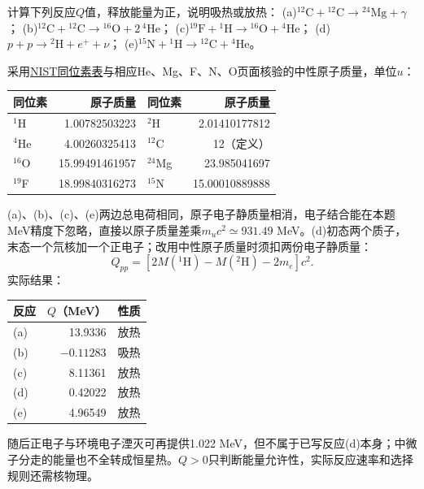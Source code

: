 \begin{exercise}
计算下列反应$Q$值，释放能量为正，说明吸热或放热：
(a)$^{12}\mathrm C+{}^{12}\mathrm C\to{}^{24}\mathrm{Mg}+\gamma$；
(b)$^{12}\mathrm C+{}^{12}\mathrm C\to{}^{16}\mathrm O+2\,{}^4\mathrm{He}$；
(c)$^{19}\mathrm F+{}^1\mathrm H\to{}^{16}\mathrm O+{}^4\mathrm{He}$；
(d)$p+p\to{}^2\mathrm H+e^++\nu$；
(e)$^{15}\mathrm N+{}^1\mathrm H\to{}^{12}\mathrm C+{}^4\mathrm{He}$。
\end{exercise}
\begin{solution}
采用\href{https://physics.nist.gov/cgi-bin/Compositions/stand_alone.pl?ele=H}{NIST同位素表}与相应He、Mg、F、N、O页面核验的中性原子质量，单位$u$：
\begin{center}\begin{tabular}{lr@{\qquad}lr}\toprule
同位素&原子质量&同位素&原子质量\\\midrule
$^1$H&1.00782503223&$^2$H&2.01410177812\\
$^4$He&4.00260325413&$^{12}$C&12（定义）\\
$^{16}$O&15.99491461957&$^{24}$Mg&23.985041697\\
$^{19}$F&18.99840316273&$^{15}$N&15.00010889888\\\bottomrule
\end{tabular}\end{center}
(a)、(b)、(c)、(e)两边总电荷相同，原子电子静质量相消，电子结合能在本题MeV精度下忽略，直接以原子质量差乘$m_uc^2\simeq931.49$ MeV。(d)初态两个质子，末态一个氘核加一个正电子；改用中性原子质量时须扣两份电子静质量：
\[
 Q_{pp}=[2M(^1\mathrm H)-M(^2\mathrm H)-2m_e]c^2.
\]
实际结果：
\begin{center}\begin{tabular}{lrl}\toprule
反应&$Q$（MeV）&性质\\\midrule
(a)&13.9336&放热\\
(b)&$-0.11283$&吸热\\
(c)&8.11361&放热\\
(d)&0.42022&放热\\
(e)&4.96549&放热\\\bottomrule
\end{tabular}\end{center}
随后正电子与环境电子湮灭可再提供1.022 MeV，但不属于已写反应(d)本身；中微子分走的能量也不全转成恒星热。$Q>0$只判断能量允许性，实际反应速率和选择规则还需核物理。
\end{solution}

